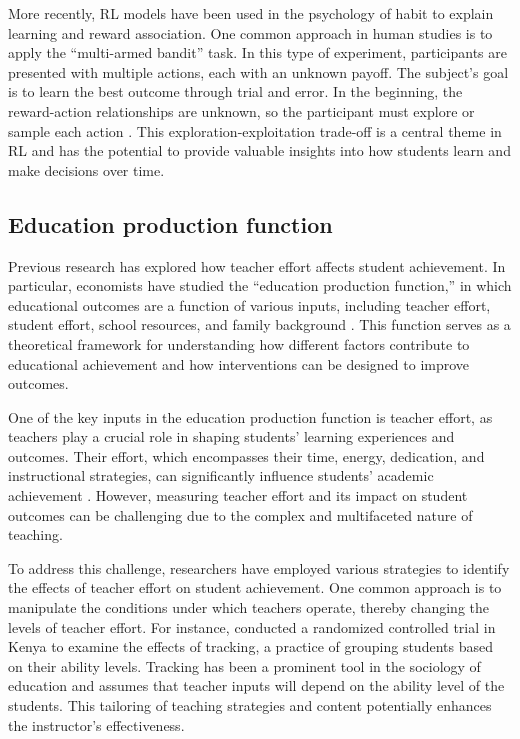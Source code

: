\documentclass[
  number,
  preprint,
  3p,
  onecolumn]{elsarticle}
\begin{document}
More recently, RL models have been used in the psychology of habit to
explain learning and reward association. One common approach in human
studies is to apply the ``multi-armed bandit'' task. In this type of
experiment, participants are presented with multiple actions, each with
an unknown payoff. The subject's goal is to learn the best outcome
through trial and error. In the beginning, the reward-action
relationships are unknown, so the participant must explore or sample
each action \citep{sutton2018} . This exploration-exploitation trade-off
is a central theme in RL and has the potential to provide valuable
insights into how students learn and make decisions over time.

\subsection{Education production
function}\label{education-production-function}

Previous research has explored how teacher effort affects student
achievement. In particular, economists have studied the ``education
production function,'' in which educational outcomes are a function of
various inputs, including teacher effort, student effort, school
resources, and family background \citep{hedges1994}. This function
serves as a theoretical framework for understanding how different
factors contribute to educational achievement and how interventions can
be designed to improve outcomes.

One of the key inputs in the education production function is teacher
effort, as teachers play a crucial role in shaping students' learning
experiences and outcomes. Their effort, which encompasses their time,
energy, dedication, and instructional strategies, can significantly
influence students' academic achievement \citep{rivkin2005}. However,
measuring teacher effort and its impact on student outcomes can be
challenging due to the complex and multifaceted nature of teaching.

To address this challenge, researchers have employed various strategies
to identify the effects of teacher effort on student achievement. One
common approach is to manipulate the conditions under which teachers
operate, thereby changing the levels of teacher effort. For instance,
\citep{duflo2011} conducted a randomized controlled trial in Kenya to
examine the effects of tracking, a practice of grouping students based
on their ability levels. Tracking has been a prominent tool in the
sociology of education and assumes that teacher inputs will depend on
the ability level of the students. This tailoring of teaching strategies
and content potentially enhances the instructor's effectiveness.
\end{document}
